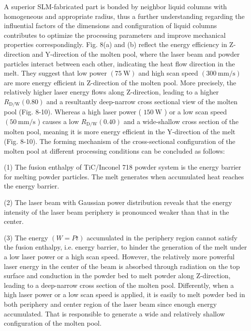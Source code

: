 \documentclass[10pt]{article}
\begin{document}
A superior SLM-fabricated part is bonded by neighbor liquid columns with homogeneous and appropriate radius, thus a further understanding regarding the influential factors of the dimensions and configuration of liquid columns contributes to optimize the processing parameters and improve mechanical properties correspondingly. Fig. 8(a) and (b) reflect the energy efficiency in Z-direction and Y-direction of the molten pool, where the laser beam and powder particles interact between each other, indicating the heat flow direction in the melt. They suggest that low power $(75 \mathrm{~W})$ and high scan speed $(300 \mathrm{~mm} / \mathrm{s})$ are more energy efficient in Z-direction of the molten pool. More precisely, the relatively higher laser energy flows along Z-direction, leading to a higher $R_{\mathrm{D} / \mathrm{W}}(0.80)$ and a resultantly deep-narrow cross sectional view of the molten pool (Fig. 8-10). Whereas a high laser power ( $150 \mathrm{~W}$ ) or a low scan speed $\left(50 \mathrm{~mm} / \mathrm{s}\right.$ ) causes a low $R_{\mathrm{D} / \mathrm{W}}(0.40)$ and a wide-shallow cross section of the molten pool, meaning it is more energy efficient in the Y-direction of the melt (Fig. 8-10). The forming mechanism of the cross-sectional configuration of the molten pool at different processing conditions can be concluded as follows:

(1) The fusion enthalpy of TiC/Inconel 718 powder system is the energy barrier for melting powder particles. The melt generates when accumulated heat reaches the energy barrier.

(2) The laser beam with Gaussian power distribution reveals that the energy intensity of the laser beam periphery is pronounced weaker than that in the center.

(3) The energy $(W=P t)$ accumulated in the periphery region cannot satisfy the fusion enthalpy, i.e. energy barrier, to hinder the generation of the melt under a low laser power or a high scan speed. However, the relatively more powerful laser energy in the center of the beam is absorbed through radiation on the top surface and conduction in the powder bed to melt powder along Z-direction, leading to a deep-narrow cross section of the molten pool. Differently, when a high laser power or a low scan speed is applied, it is easily to melt powder bed in both periphery and center region of the laser beam since enough energy accumulated. That is responsible to generate a wide and relatively shallow configuration of the molten pool.
\end{document}
